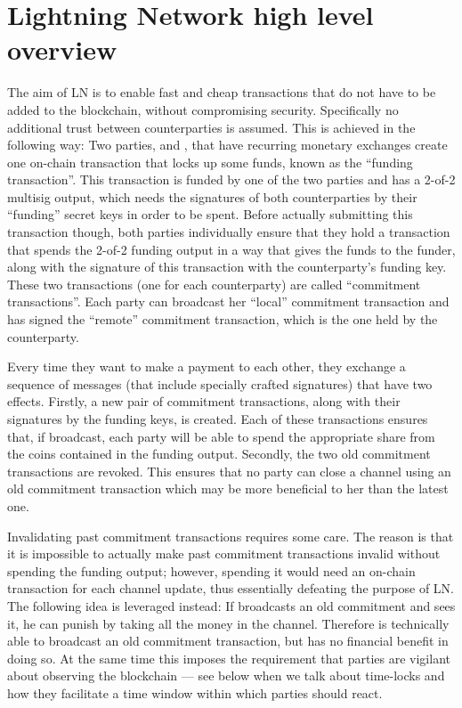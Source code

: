 \section{Lightning Network high level overview}
\label{sec:ov-lightning}


    The aim of LN is to enable fast and cheap transactions that do not have to
    be added to the blockchain, without compromising security. Specifically no
    additional trust between counterparties is assumed. This is achieved in the
    following way: Two parties, \alice{} and \bob, that have recurring monetary
    exchanges create one on-chain transaction that locks up some funds, known as
    the ``funding transaction''. This transaction is funded by one of the two
    parties and has a 2-of-2 multisig output, which needs the signatures of both
    counterparties by their ``funding'' secret keys in order to be spent. Before
    actually submitting this transaction though, both parties individually
    ensure that they hold a transaction that spends the 2-of-2 funding output in
    a way that gives the funds to the funder, along with the signature of this
    transaction with the counterparty's funding key. These two transactions (one
    for each counterparty) are called ``commitment transactions''. Each party
    can broadcast her ``local'' commitment transaction and has signed the
    ``remote'' commitment transaction, which is the one held by the
    counterparty.

    Every time they want to make a payment to each other, they exchange a
    sequence of messages (that include specially crafted signatures) that have
    two effects.  Firstly, a new pair of commitment transactions, along with
    their signatures by the funding keys, is created. Each of these transactions
    ensures that, if broadcast, each party will be able to spend the appropriate
    share from the coins contained in the funding output.  Secondly, the two old
    commitment transactions are revoked.  This ensures that no party can close a
    channel using an old commitment transaction which may be more beneficial to
    her than the latest one.

    Invalidating past commitment transactions requires some care. The reason is
    that it is impossible to actually make past commitment transactions invalid
    without spending the funding output; however, spending it would need an
    on-chain transaction for each channel update, thus essentially defeating the
    purpose of LN. The following idea is leveraged instead: If \alice{}
    broadcasts an old commitment and \bob{} sees it, he can punish \alice{} by
    taking all the money in the channel. Therefore \alice{} is technically able
    to broadcast an old commitment transaction, but has no financial benefit in
    doing so. At the same time this imposes the requirement that parties are
    vigilant about observing the blockchain --- see below when we talk about
    time-locks and how they facilitate a  time window within which  parties
    should react.

